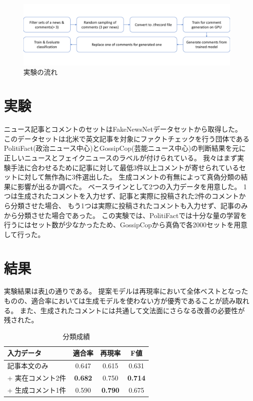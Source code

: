 \documentclass[twocolumn, a4paper, uplatex]{UECIEresume}
\begin{document}
\begin{figure}[t]
    \centering
    \includegraphics[width=\linewidth,pagebox=cropbox,clip]{images/fig_process.pdf}
    \caption{実験の流れ}
    \label{fig:process}
\end{figure}

\section{実験}

ニュース記事とコメントのセットはFakeNewsNetデータセット\cite{Shu2018FakeNewsNetAD}から取得した。
このデータセットは北米で英文記事を対象にファクトチェックを行う団体であるPolitiFact(政治ニュース中心)とGossipCop(芸能ニュース中心)の判断結果を元に正しいニュースとフェイクニュースのラベルが付けられている。
我々はまず実験手法に合わせるために記事に対して最低3件以上コメントが寄せられているセットに対して無作為に3件選出した。
生成コメントの有無によって真偽分類の結果に影響が出るか調べた。
ベースラインとして2つの入力データを用意した。
1つは生成されたコメントを入力せず、記事と実際に投稿された2件のコメントから分類させた場合、
もう1つは実際に投稿されたコメントも入力せず、記事のみから分類させた場合であった。
この実験では、PolitiFactでは十分な量の学習を行うにはセット数が少なかったため、GossipCopから真偽で各2000セットを用意して行った。

\section{結果}

実験結果は表\ref{tbl:classify_results}の通りである。
提案モデルは再現率において全体ベストとなったものの、適合率においては生成モデルを使わない方が優秀であることが読み取れる。
また、生成されたコメントには共通して文法面にさらなる改善の必要性が残された。

\begin{table}[!t]
  \caption{分類成績}
  \label{tbl:classify_results}
  \centering
  \begin{tabular}{lccc}
      \hline
      入力データ           & 適合率 & 再現率 & F値 \\ \hline\hline
      記事本文のみ         & 0.647     & 0.615  & 0.631    \\
      + 実在コメント2件  & \textbf{0.682}     & 0.750  & \textbf{0.714}    \\
      + 生成コメント1件 & 0.590     & \textbf{0.790}  & 0.675    \\ \hline
  \end{tabular}
\end{table}
\end{document}
